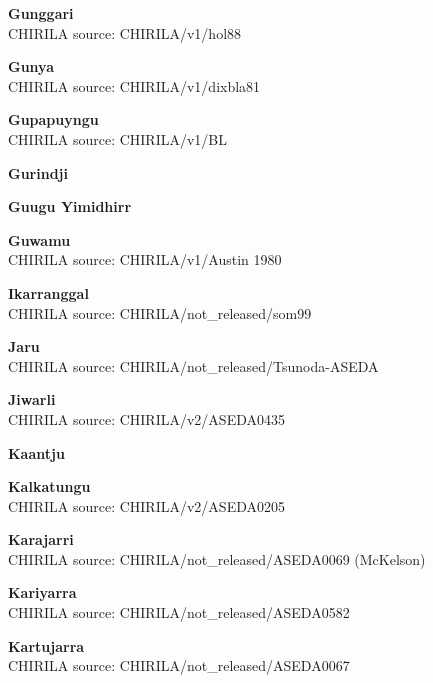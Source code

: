 
\textbf{Gunggari}\\
CHIRILA source: CHIRILA/v1/hol88


\textbf{Gunya}\\
CHIRILA source: CHIRILA/v1/dixbla81


\textbf{Gupapuyngu}\\
CHIRILA source: CHIRILA/v1/BL


\textbf{Gurindji}\\

\textbf{Guugu Yimidhirr}\\

\textbf{Guwamu}\\
CHIRILA source: CHIRILA/v1/Austin 1980


\textbf{Ikarranggal}\\
CHIRILA source: CHIRILA/not\_released/som99

\textbf{Jaru}\\
CHIRILA source: CHIRILA/not\_released/Tsunoda-ASEDA


\textbf{Jiwarli}\\
CHIRILA source: CHIRILA/v2/ASEDA0435


\textbf{Kaantju}\\

\textbf{Kalkatungu}\\
CHIRILA source: CHIRILA/v2/ASEDA0205


\textbf{Karajarri}\\
CHIRILA source: CHIRILA/not\_released/ASEDA0069 (McKelson)


\textbf{Kariyarra}\\
CHIRILA source: CHIRILA/not\_released/ASEDA0582


\textbf{Kartujarra}\\
CHIRILA source: CHIRILA/not\_released/ASEDA0067

